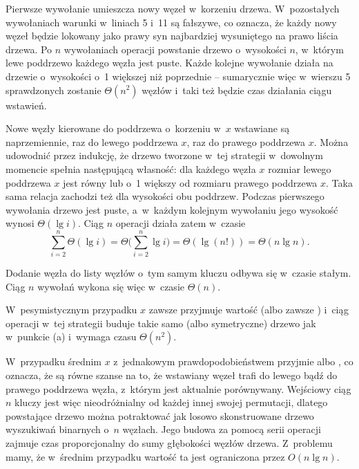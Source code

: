 
\subproblem %
Pierwsze wywołanie  umieszcza nowy węzeł w~korzeniu drzewa.
W~pozostałych wywołaniach warunki w~liniach 5 i~11 są fałszywe, co oznacza, że każdy nowy węzeł będzie lokowany jako prawy syn najbardziej wysuniętego na prawo liścia drzewa.
Po $n$ wywołaniach operacji  powstanie drzewo o~wysokości $n$, w~którym lewe poddrzewo każdego węzła jest puste.
Każde kolejne wywołanie działa na drzewie o~wysokości o~1 większej niż poprzednie -- sumarycznie więc w~wierszu 5 sprawdzonych zostanie $\Theta(n^2)$ węzłów i~taki też będzie czas działania ciągu wstawień.

\subproblem %
Nowe węzły kierowane do poddrzewa o~korzeniu w~$x$ wstawiane są naprzemiennie, raz do lewego poddrzewa $x$, raz do prawego poddrzewa $x$.
Można udowodnić przez indukcję, że drzewo tworzone w~tej strategii w~dowolnym momencie spełnia następującą własność: dla każdego węzła $x$ rozmiar lewego poddrzewa $x$ jest równy lub o~1 większy od rozmiaru prawego poddrzewa $x$.
Taka sama relacja zachodzi też dla wysokości obu poddrzew.
Podczas pierwszego wywołania  drzewo jest puste, a~w~każdym kolejnym wywołaniu jego wysokość wynosi $\Theta(\lg i)$.
Ciąg $n$ operacji  działa zatem w~czasie
\[
	\sum_{i=2}^n\Theta(\lg i) = \Theta\biggl(\sum_{i=2}^n\lg i\biggr) = \Theta(\lg(n!)) = \Theta(n\lg n).
\]

\subproblem %
Dodanie węzła do listy węzłów o~tym samym kluczu odbywa się w~czasie stałym.
Ciąg $n$ wywołań  wykona się więc w~czasie $\Theta(n)$.

\subproblem %
W~pesymistycznym przypadku $x$ zawsze przyjmuje wartość  (albo zawsze ) i~ciąg operacji  w~tej strategii buduje takie samo (albo symetryczne) drzewo jak w~punkcie (a) i~wymaga czasu $\Theta(n^2)$.

W~przypadku średnim $x$ z~jednakowym prawdopodobieństwem przyjmie  albo , co oznacza, że są równe szanse na to, że wstawiany węzeł trafi do lewego bądź do prawego poddrzewa węzła, z~którym jest aktualnie porównywany.
Wejściowy ciąg $n$ kluczy jest więc nieodróżnialny od każdej innej swojej permutacji, dlatego powstające drzewo można potraktować jak losowo skonstruowane drzewo wyszukiwań binarnych o~$n$ węzłach.
Jego budowa za pomocą serii operacji  zajmuje czas proporcjonalny do sumy głębokości węzłów drzewa.
Z~problemu  mamy, że w~średnim przypadku wartość ta jest ograniczona przez $O(n\lg n)$.
